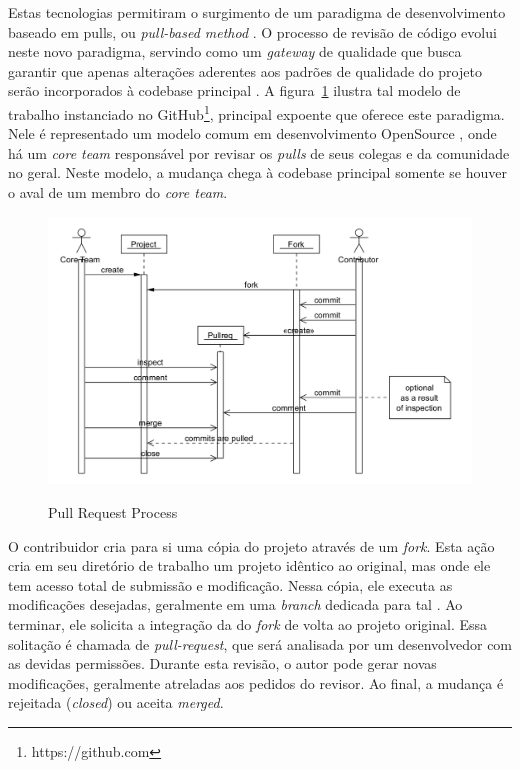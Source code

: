 \documentclass[preprint,12pt]{elsarticle}
\begin{document}
    Estas tecnologias permitiram o surgimento de um paradigma de desenvolvimento baseado em pulls, ou \textit{pull-based method} \cite{gousios2014}. O processo de revisão de código evolui neste novo paradigma, servindo como um \textit{gateway} de qualidade que busca garantir que apenas alterações aderentes aos padrões de qualidade do projeto serão incorporados à codebase principal \cite{gousios2015}. A figura~\ref{fig:pull-request-flow} ilustra tal modelo de trabalho instanciado no GitHub\footnote{https://github.com}, principal expoente que oferece este paradigma. Nele é representado um modelo comum em desenvolvimento OpenSource \cite{6385140}, onde há um \textit{core team} responsável por revisar os \textit{pulls} de seus colegas e da comunidade no geral. Neste modelo, a mudança chega à codebase principal somente se houver o aval de um membro do \textit{core team}.

     \begin{figure}[!htbp]
      \includegraphics[width=\textwidth]{pull-request-flow}\label{fig:pull-request-flow}
      \caption{Pull Request Process \cite{gousios2014}}
    \end{figure}

    O contribuidor cria para si uma cópia do projeto através de um \textit{fork}. Esta ação cria em seu diretório de trabalho um projeto idêntico ao original, mas onde ele tem acesso total de submissão e modificação. Nessa cópia, ele executa as modificações desejadas, geralmente em uma \textit{branch} dedicada para tal \cite{gousios2016}. Ao terminar, ele solicita a integração da  do \textit{fork} de volta ao projeto original. Essa solitação é chamada de \textit{pull-request}, que será analisada por um desenvolvedor com as devidas permissões. Durante esta revisão, o autor pode gerar novas modificações, geralmente atreladas aos pedidos do revisor. Ao final, a mudança é rejeitada (\textit{closed}) ou aceita \textit{merged}.
\end{document}
